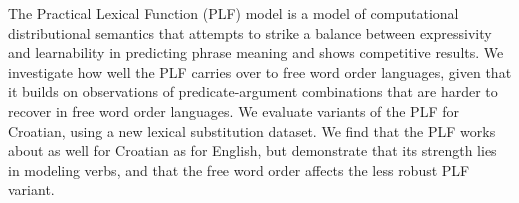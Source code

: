 The Practical Lexical Function (PLF) model is a model of computational distributional semantics that attempts to strike a balance between expressivity and learnability in predicting phrase meaning and shows competitive results. We investigate how well the PLF carries over to free word order languages, given that it builds on observations of predicate-argument combinations that are harder to recover in free word order languages. We evaluate variants of the PLF for Croatian, using a new lexical substitution dataset. We find that the PLF works about as well for Croatian as for English, but demonstrate that its strength lies in modeling verbs, and that the free word order affects the less robust PLF variant.
